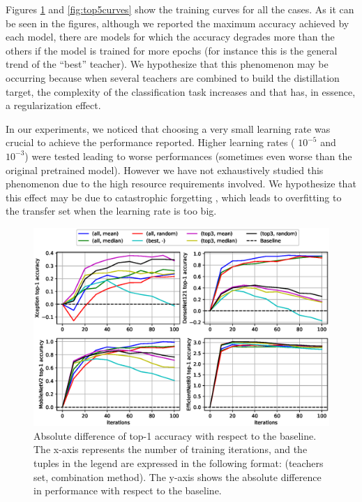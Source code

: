 \documentclass{elsarticle}
\begin{document}
	Figures \ref{fig:top1curves} and \ref{fig:top5curves} show the training curves for all the cases. As it can be seen in the figures, although we reported the maximum accuracy achieved by each model, there are models for which the accuracy degrades more than the others if the model is trained for more epochs (for instance this is the general trend of the ``best'' teacher). We hypothesize that this phenomenon may be occurring because when several teachers are combined to build the distillation target, the complexity of the classification task increases and that has, in essence, a regularization effect.
	
	In our experiments, we noticed that choosing a very small learning rate was crucial to achieve the performance reported. Higher learning rates ( $10^{-5}$ and  $10^{-3}$) were tested leading to worse performances (sometimes even worse than the original pretrained model). However we have not exhaustively studied this phenomenon due to the high resource requirements involved. We hypothesize that this effect may be due to catastrophic forgetting \cite{French99}, which leads to overfitting to the transfer set when the learning rate is too big.
			
			
	\begin{figure}[h!]
		\centering
		\includegraphics[width=1\linewidth]{img/top1_curves}
		\caption{Absolute difference of top-1 accuracy with respect to the baseline. The x-axis represents the number of training iterations, and the tuples in the legend are expressed in the following format: (teachers set, combination method). The y-axis shows the absolute difference in performance with respect to the baseline.}
		\label{fig:top1curves}
	\end{figure}
	
\end{document}
